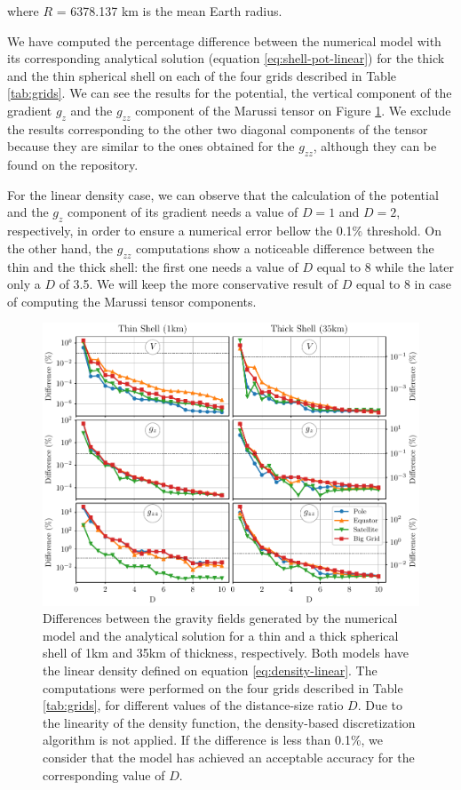 \documentclass[extra]{gji}
\begin{document}
\noindent where $R$ = 6378.137 km is the mean Earth radius.

We have computed the percentage difference between the numerical model
with its corresponding analytical solution (equation
\ref{eq:shell-pot-linear}) for the thick and the thin spherical shell
on each of the four grids described in Table \ref{tab:grids}.
We can see the results for the potential, the vertical component of the
gradient $g_z$ and the $g_{zz}$ component of the Marussi tensor on
Figure \ref{fig:D-linear}.
We exclude the results corresponding to the other two diagonal
components of the tensor because they are similar to the ones obtained
for the $g_{zz}$, although they can be found on the repository.

For the linear density case, we can observe that the calculation of the
potential and the $g_z$ component of its gradient needs a value of
$D=1$ and $D=2$, respectively, in order to ensure a numerical error
bellow the 0.1\% threshold.
On the other hand, the $g_{zz}$ computations show a noticeable
difference between the thin and the thick shell: the first one needs a
value of $D$ equal to 8 while the later only a $D$ of 3.5.
We will keep the more conservative result of $D$ equal to 8 in case of
computing the Marussi tensor components.

\begin{figure}
\centering
\includegraphics[width=\linewidth]{figures/linear-D.pdf}
\caption{
    Differences between the gravity fields generated by the numerical model
    and the analytical solution for a thin and a thick spherical shell of 1km
    and 35km of thickness, respectively.
    Both models have the linear density defined on equation
    \ref{eq:density-linear}.
    The computations were performed on the four grids described in
    Table \ref{tab:grids}, for different values of the distance-size
    ratio $D$.
    Due to the linearity of the density function, the density-based
    discretization algorithm is not applied.
    If the difference is less than 0.1\%, we consider that the model
    has achieved an acceptable accuracy for the corresponding value of
    $D$.
    }
\label{fig:D-linear}
\end{figure}
\end{document}
